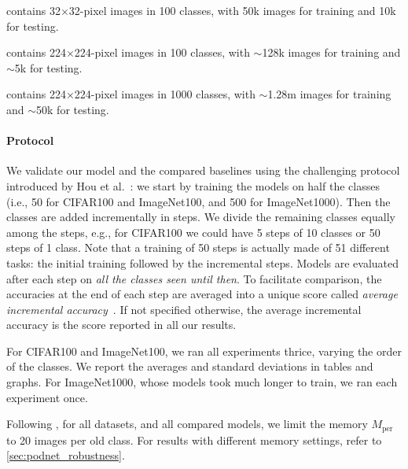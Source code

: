 {\begin{description} \setlength{\parskip}{0pt}
    \item[CIFAR100] contains 32$\times$32-pixel images in 100 classes, with 50k images for training
          and 10k for testing.
    \item[ImageNet100] contains 224$\times$224-pixel images in 100 classes, with $\sim$128k images
          for training and $\sim$5k for testing.
    \item[ImageNet1000] contains 224$\times$224-pixel images in 1000 classes, with $\sim$1.28m
          images for training and $\sim$50k for testing. \end{description}}

\paragraph{Protocol} We validate our model and the compared baselines using the challenging protocol
introduced by Hou et al.~\citep{hou2019ucir}: we start by training the models on half the classes
(i.e., 50 for CIFAR100 and ImageNet100, and 500 for ImageNet1000). Then the classes are added
incrementally in steps. We divide the remaining classes equally among the steps, e.g., for CIFAR100
we could have 5 steps of 10 classes or 50 steps of 1 class. Note that a training of 50 steps is
actually made of 51 different tasks: the initial training followed by the incremental steps. Models
are evaluated after each step on \textit{all the classes seen until then}. To facilitate comparison,
the accuracies at the end of each step are averaged into a unique score called \textit{average
    incremental accuracy}~\citep{rebuffi2017icarl}. If not specified otherwise, the average incremental
accuracy is the score reported in all our results.

For CIFAR100 and ImageNet100, we ran all experiments thrice, varying the order of the classes. We
report the averages and standard deviations in tables and graphs. For ImageNet1000, whose models
took much longer to train, we ran each experiment once.

Following \cite{hou2019ucir}, for all datasets, and all compared models, we limit the
memory $M_\textrm{per}$ to 20 images per old class. For results with different memory settings,
refer to \autoref{sec:podnet_robustness}.

